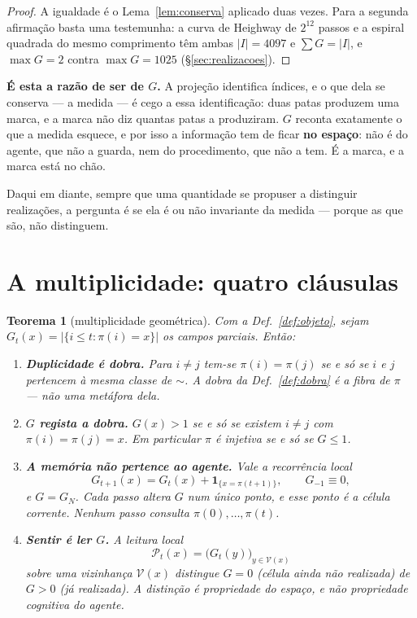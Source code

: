 \documentclass[11pt,a4paper]{article}
\newcommand{\abs}[1]{\lvert #1\rvert}
\newtheorem{teorema}{Teorema}
\begin{document}
\begin{proof}
A igualdade é o Lema~\ref{lem:conserva} aplicado duas vezes. Para a segunda
afirmação basta uma testemunha: a curva de Heighway de $2^{12}$ passos e a
espiral quadrada do mesmo comprimento têm ambas $\abs{I}=4097$ e
$\sum G=\abs{I}$, e $\max G=2$ contra $\max G=1025$
(§\ref{sec:realizacoes}).
\end{proof}

\medskip\noindent\textbf{É esta a razão de ser de $G$.} A projeção identifica
índices, e o que dela se conserva --- a medida --- é cego a essa identificação:
duas patas produzem uma marca, e a marca não diz quantas patas a produziram. $G$
reconta exatamente o que a medida esquece, e por isso a informação tem de ficar
\textbf{no espaço}: não é do agente, que não a guarda, nem do procedimento, que
não a tem. É a marca, e a marca está no chão.

\medskip\noindent Daqui em diante, sempre que uma quantidade se propuser a
distinguir realizações, a pergunta é se ela é ou não invariante da medida ---
porque as que são, não distinguem.

\section{A multiplicidade: quatro cláusulas}\label{sec:mult}

\begin{teorema}[multiplicidade geométrica]\label{thm:multiplicidade}
Com a Def.~\ref{def:objeto}, sejam $G_t(x)=\lvert\{i\le t:\pi(i)=x\}\rvert$ os
campos parciais. Então:
\begin{enumerate}\itemsep3pt
\item[(1)] \textbf{Duplicidade é dobra.} Para $i\neq j$ tem-se $\pi(i)=\pi(j)$
se e só se $i$ e $j$ pertencem à mesma classe de $\sim$. A dobra da
Def.~\ref{def:dobra} é a fibra de $\pi$ --- não uma metáfora dela.
\item[(2)] \textbf{$G$ regista a dobra.} $G(x)>1$ se e só se existem $i\neq j$
com $\pi(i)=\pi(j)=x$. Em particular $\pi$ é injetiva se e só se $G\le1$.
\item[(3)] \textbf{A memória não pertence ao agente.} Vale a recorrência local
\[
G_{t+1}(x)=G_t(x)+\mathbf{1}_{\{x=\pi(t+1)\}},\qquad G_{-1}\equiv0,
\]
e $G=G_N$. Cada passo altera $G$ num único ponto, e esse ponto é a célula
corrente. Nenhum passo consulta $\pi(0),\dots,\pi(t)$.
\item[(4)] \textbf{Sentir é ler $G$.} A leitura local
      \[
      \mathcal{P}_t(x)=\bigl(G_t(y)\bigr)_{y\in \mathcal{V}(x)}
      \]
      sobre uma vizinhança $\mathcal{V}(x)$ distingue $G=0$ (célula ainda não realizada) de
      $G>0$ (já realizada). A distinção é propriedade do \emph{espaço}, e não
      propriedade cognitiva do agente.
\end{enumerate}
\end{teorema}
\end{document}
